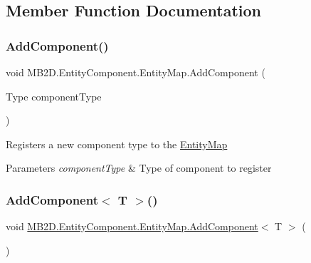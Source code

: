 \subsection{Member Function Documentation}
\hypertarget{class_m_b2_d_1_1_entity_component_1_1_entity_map_aff9e50266b46d782c31c5b482b86540c}{}\label{class_m_b2_d_1_1_entity_component_1_1_entity_map_aff9e50266b46d782c31c5b482b86540c} 
\subsubsection{\texorpdfstring{Add\+Component()}{AddComponent()}}
{\footnotesize\ttfamily void M\+B2\+D.\+Entity\+Component.\+Entity\+Map.\+Add\+Component (\begin{DoxyParamCaption}\item[{Type}]{component\+Type }\end{DoxyParamCaption})\hspace{0.3cm}{\ttfamily [inline]}}



Registers a new component type to the \hyperlink{class_m_b2_d_1_1_entity_component_1_1_entity_map}{Entity\+Map} 


\begin{DoxyParams}{Parameters}
{\em component\+Type} & Type of component to register\\
\hline
\end{DoxyParams}
\hypertarget{class_m_b2_d_1_1_entity_component_1_1_entity_map_a3832e5a6ae181f71d002e81caf008da4}{}\label{class_m_b2_d_1_1_entity_component_1_1_entity_map_a3832e5a6ae181f71d002e81caf008da4} 
\subsubsection{\texorpdfstring{Add\+Component$<$ T $>$()}{AddComponent< T >()}}
{\footnotesize\ttfamily void \hyperlink{class_m_b2_d_1_1_entity_component_1_1_entity_map_aff9e50266b46d782c31c5b482b86540c}{M\+B2\+D.\+Entity\+Component.\+Entity\+Map.\+Add\+Component}$<$ T $>$ (\begin{DoxyParamCaption}{ }\end{DoxyParamCaption})\hspace{0.3cm}{\ttfamily [inline]}}



